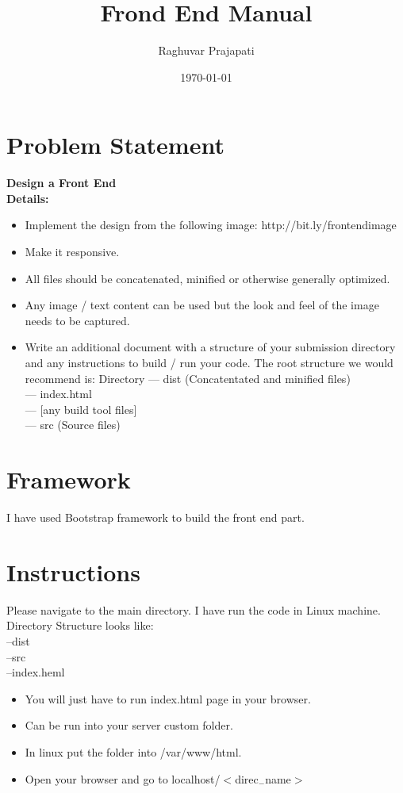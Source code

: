 \documentclass[12pt]{article}
\title{Frond End Manual}
\author{Raghuvar Prajapati}
\date{\today}
\begin{document}
\maketitle

\tableofcontents
\clearpage

\section{Problem Statement}

\textbf{Design a Front End}\\

\textbf{Details:} 

\begin{itemize}
\item Implement the design from the following image: http://bit.ly/frontendimage
\item Make it responsive.
\item All files should be concatenated, minified or otherwise generally optimized.
\item Any image / text content can be used but the look and feel of the image needs to be captured.
\item Write an additional document with a structure of your submission directory and any instructions to build / run your code. The root structure we would recommend is:
Directory
--- dist (Concatentated and minified files) \\
--- index.html \\
--- [any build tool files] \\
--- src (Source files)
\end{itemize}

\section{Framework}
I have used Bootstrap framework to build the front end part.

\section{Instructions}
Please navigate to the main directory. I have run the code in Linux machine. \\
Directory Structure looks like:\\
--dist\\
--src\\
--index.heml



\newpage
\begin{itemize}
\item You will just have to run index.html page in your browser.
\item Can be run into your server custom folder.
\item In linux put the folder into /var/www/html.
\item Open your browser and go to localhost/$<$direc$_{-}$name$>$
\end{itemize}
\end{document}

